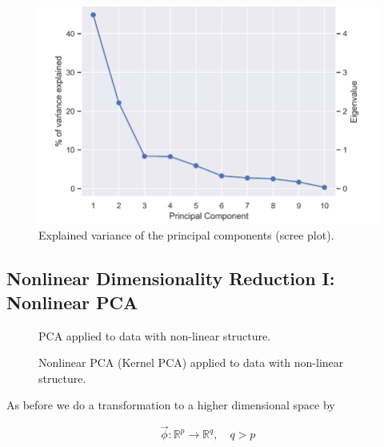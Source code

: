 \begin{figure}
    \centering
    \includegraphics[width=.75\textwidth]{figures/var_exp.png}
    \caption{Explained variance of the principal components (scree plot).}
    \label{fig:explained_variance}
\end{figure}

\subsection{Nonlinear Dimensionality Reduction I: Nonlinear PCA}

\begin{figure}[!htb]
    \centering
    
    \caption{PCA applied to data with non-linear structure.}
    \label{fig:pca_examples}
\end{figure}


\begin{figure}[!htb]
    \centering
    
    \caption{Nonlinear PCA (Kernel PCA) applied to data with non-linear structure.}
    \label{fig:nonlinear_pca}
\end{figure}

As before we do a transformation to a higher dimensional space by

\begin{equation}
    \vec{\phi} : \mathbb{R}^p \rightarrow \mathbb{R}^q, \quad q > p
\end{equation}

